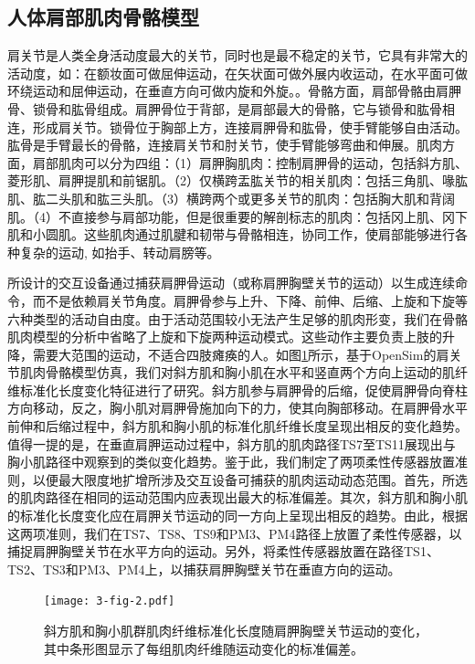 \subsection{人体肩部肌肉骨骼模型}
肩关节是人类全身活动度最大的关节，同时也是最不稳定的关节，它具有非常大的活动度，如：在额妆面可做屈伸运动，在矢状面可做外展内收运动，在水平面可做环绕运动和屈伸运动，在垂直方向可做内旋和外旋。。骨骼方面，肩部骨骼由肩胛骨、锁骨和肱骨组成。肩胛骨位于背部，是肩部最大的骨骼，它与锁骨和肱骨相连，形成肩关节。锁骨位于胸部上方，连接肩胛骨和肱骨，使手臂能够自由活动。肱骨是手臂最长的骨骼，连接肩关节和肘关节，使手臂能够弯曲和伸展。肌肉方面，肩部肌肉可以分为四组：（1）肩胛胸肌肉：控制肩胛骨的运动，包括斜方肌、菱形肌、肩胛提肌和前锯肌。（2）仅横跨盂肱关节的相关肌肉：包括三角肌、喙肱肌、肱二头肌和肱三头肌。（3）横跨两个或更多关节的肌肉：包括胸大肌和背阔肌。（4）不直接参与肩部功能，但是很重要的解剖标志的肌肉：包括冈上肌、冈下肌和小圆肌。这些肌肉通过肌腱和韧带与骨骼相连，协同工作，使肩部能够进行各种复杂的运动, 如抬手、转动肩膀等\cite{terryFunctionalAnatomyShoulder2000}。

所设计的交互设备通过捕获肩胛骨运动（或称肩胛胸壁关节的运动）以生成连续命令，而不是依赖肩关节角度。肩胛骨参与上升、下降、前伸、后缩、上旋和下旋等六种类型的活动自由度。由于活动范围较小无法产生足够的肌肉形变，我们在骨骼肌肉模型的分析中省略了上旋和下旋两种运动模式。这些动作主要负责上肢的升降，需要大范围的运动，不适合四肢瘫痪的人。如图\ref*{3-fig-2}所示，基于OpenSim\cite{chadwickRealTimeSimulationThreeDimensional2014}的肩关节肌肉骨骼模型仿真，我们对斜方肌和胸小肌在水平和竖直两个方向上运动的肌纤维标准化长度变化特征进行了研究。斜方肌参与肩胛骨的后缩，促使肩胛骨向脊柱方向移动，反之，胸小肌对肩胛骨施加向下的力，使其向胸部移动。在肩胛骨水平前伸和后缩过程中，斜方肌和胸小肌的标准化肌纤维长度呈现出相反的变化趋势。值得一提的是，在垂直肩胛运动过程中，斜方肌的肌肉路径TS7至TS11展现出与胸小肌路径中观察到的类似变化趋势。鉴于此，我们制定了两项柔性传感器放置准则，以便最大限度地扩增所涉及交互设备可捕获的肌肉运动动态范围。首先，所选的肌肉路径在相同的运动范围内应表现出最大的标准偏差。其次，斜方肌和胸小肌的标准化长度变化应在肩胛关节运动的同一方向上呈现出相反的趋势。由此，根据这两项准则，我们在TS7、TS8、TS9和PM3、PM4路径上放置了柔性传感器，以捕捉肩胛胸壁关节在水平方向的运动。另外，将柔性传感器放置在路径TS1、TS2、TS3和PM3、PM4上，以捕获肩胛胸壁关节在垂直方向的运动。

\begin{figure}[!t]
    \centering
    \texttt{[image: 3-fig-2.pdf]}
    \caption{斜方肌和胸小肌群肌肉纤维标准化长度随肩胛胸壁关节运动的变化，其中条形图显示了每组肌肉纤维随运动变化的标准偏差。}
    \label{3-fig-2}
\end{figure}     

